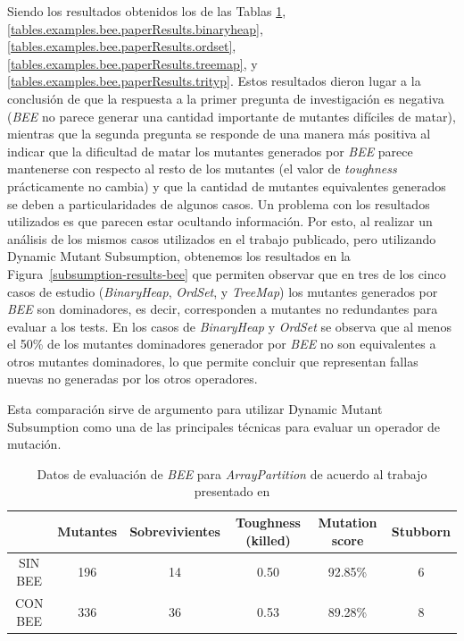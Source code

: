 Siendo los resultados obtenidos los de las Tablas \ref{tables.examples.bee.paperResults.arraypartition}, \ref{tables.examples.bee.paperResults.binaryheap}, \ref{tables.examples.bee.paperResults.ordset}, \ref{tables.examples.bee.paperResults.treemap}, y \ref{tables.examples.bee.paperResults.trityp}. Estos resultados dieron lugar a la conclusi\'on de que la respuesta a la primer pregunta de investigaci\'on es negativa (\emph{BEE} no parece generar una cantidad importante de mutantes dif\'iciles de matar), mientras que la segunda pregunta se responde de una manera m\'as positiva al indicar que la dificultad de matar los mutantes generados por \emph{BEE} parece mantenerse con respecto al resto de los mutantes (el valor de \emph{toughness} pr\'acticamente no cambia) y que la cantidad de mutantes equivalentes generados se deben a particularidades de algunos casos. Un problema con los resultados utilizados es que parecen estar ocultando informaci\'on. Por esto, al realizar un an\'alisis de los mismos casos utilizados en el trabajo publicado, pero utilizando Dynamic Mutant Subsumption, obtenemos los resultados en la Figura~\ref{subsumption-results-bee} que permiten observar que en tres de los cinco casos de estudio (\emph{BinaryHeap}, \emph{OrdSet}, y \emph{TreeMap}) los mutantes generados por \emph{BEE} son dominadores, es decir, corresponden a mutantes no redundantes para evaluar a los tests. En los casos de \emph{BinaryHeap} y \emph{OrdSet} se observa que al menos el 50\% de los mutantes dominadores generador por \emph{BEE} no son equivalentes a otros mutantes dominadores, lo que permite concluir que representan fallas nuevas no generadas por los otros operadores.

Esta comparaci\'on sirve de argumento para utilizar Dynamic Mutant Subsumption como una de las principales t\'ecnicas para evaluar un operador de mutaci\'on.

\begin{table}[]
	\centering
	\scriptsize
	\def\arraystretch{0.95}
	\setlength\tabcolsep{0.5mm}
	\begin{tabular}{c|ccccc|}
		\cline{2-6}
		& Mutantes & Sobrevivientes & Toughness (killed) & Mutation score & Stubborn \\ \hline
		\multicolumn{1}{|c|}{SIN BEE} & 196 & 14 & 0.50 & 92.85\% & 6 \\ \hline
		\multicolumn{1}{|c|}{CON BEE} & 336 & 36 & 0.53 & 89.28\% & 8 \\ \hline
	\end{tabular}
	\caption{Datos de evaluaci\'on de \emph{BEE} para \emph{ArrayPartition} de acuerdo al trabajo presentado en \cite{bibliography.mutation.operators.beeBridaS17}}
	\label{tables.examples.bee.paperResults.arraypartition}
\end{table}

